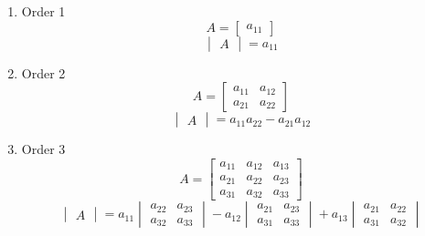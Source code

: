 \documentclass{article}
\begin{document}
\begin{enumerate}
	\item Order 1
	      $$A = \begin{bmatrix}a_{11}\end{bmatrix}$$
	      $$\begin{vmatrix}A\end{vmatrix} = a_{11}$$
	\item Order 2
	      $$A = \begin{bmatrix}
			      a_{11} & a_{12} \\
			      a_{21} & a_{22}
		      \end{bmatrix}$$
	      $$\begin{vmatrix}A\end{vmatrix} = a_{11}a_{22} - a_{21}a_{12}$$
	\item Order 3
	      $$A = \begin{bmatrix}
			      a_{11} & a_{12} & a_{13} \\
			      a_{21} & a_{22} & a_{23} \\
			      a_{31} & a_{32} & a_{33}
		      \end{bmatrix}$$
	      $$\begin{vmatrix}A\end{vmatrix} =
		      a_{11} \begin{vmatrix}
			      a_{22} & a_{23} \\
			      a_{32} & a_{33}
		      \end{vmatrix} -
		      a_{12} \begin{vmatrix}
			      a_{21} & a_{23} \\
			      a_{31} & a_{33}
		      \end{vmatrix} +
		      a_{13} \begin{vmatrix}
			      a_{21} & a_{22} \\
			      a_{31} & a_{32}
		      \end{vmatrix}
	      $$
\end{enumerate}
\end{document}
